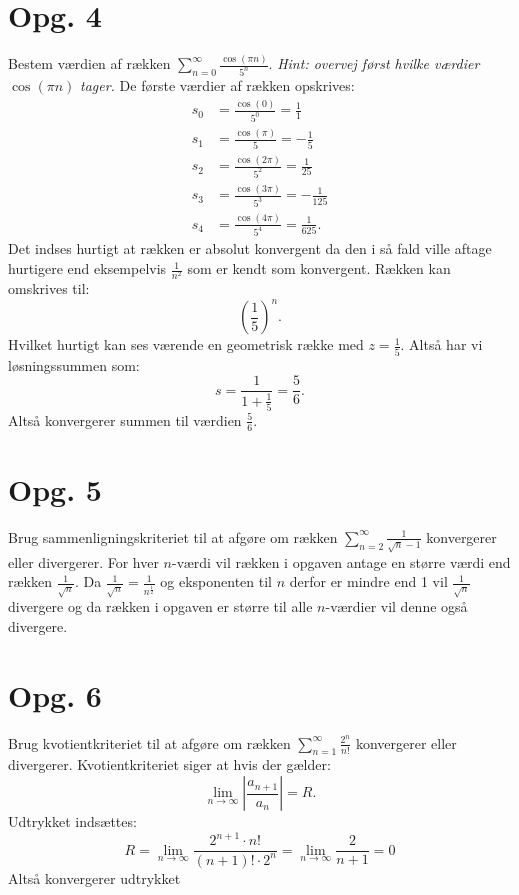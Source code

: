 \documentclass[12pt]{article}
\begin{document}
\section*{Opg. 4}
Bestem værdien af rækken $\sum_{n=0}^{\infty} \frac{\cos\left( \pi n \right)}{5^n}$. \textit{Hint: overvej først hvilke værdier} $\cos(\pi n)$ \textit{tager.}
\bigbreak
De første værdier af rækken opskrives:
\begin{align*}
  s_0 &= \frac{\cos\left( 0 \right) }{5^0} = \frac{1}{1} \\
  s_1 &= \frac{\cos \left( \pi \right)}{5} = -\frac{1}{5}\\
  s_2 &= \frac{\cos\left( 2\pi \right) }{5^2} = \frac{1}{25} \\
  s_3 &= \frac{\cos\left( 3\pi \right) }{5^3} = -\frac{1}{125} \\
  s_4 &= \frac{\cos\left( 4\pi \right) }{5^4} = \frac{1}{625}
.\end{align*} 
Det indses hurtigt at rækken er absolut konvergent da den i så fald ville aftage hurtigere end eksempelvis $\frac{1}{n^2}$ som er kendt som konvergent. Rækken kan omskrives til:
\[
  \left( \frac{1}{5} \right)^n 
.\] 
Hvilket hurtigt kan ses værende en geometrisk række med $z = \frac{1}{5}$. Altså har vi løsningssummen som:
\[
s = \frac{1}{1+\frac{1}{5}} = \frac{5}{6}
.\] 
Altså konvergerer summen til værdien $\frac{5}{6}$.


\section*{Opg. 5}
Brug sammenligningskriteriet til at afgøre om rækken $\sum_{n=2}^{\infty} \frac{1}{\sqrt{n}-1}$ konvergerer eller divergerer. 
\bigbreak
For hver $n$-værdi vil rækken i opgaven antage en større værdi end rækken $\frac{1}{\sqrt{n} }$. Da $\frac{1}{\sqrt{n}} = \frac{1}{n^{\frac{1}{2}}}$ og eksponenten til $n$ derfor er mindre end 1 vil  $\frac{1}{\sqrt{n}}$ divergere og da rækken i opgaven er større til alle $n$-værdier vil denne også divergere.

\section*{Opg. 6}
Brug kvotientkriteriet til at afgøre om rækken $\sum_{n=1}^{\infty} \frac{2^n}{n!}$ konvergerer eller divergerer.
\bigbreak
Kvotientkriteriet siger at hvis der gælder:
\[
\lim_{n \to \infty} |\frac{a_{n+1}}{a_n}| = R
.\] 
Udtrykket indsættes:
\[
R = \lim_{n \to \infty} \frac{2^{n+1}\cdot n!}{\left( n+1 \right)! \cdot 2^n} = \lim_{n \to \infty} \frac{2}{n+1} = 0
\] 
Altså konvergerer udtrykket
\end{document}
